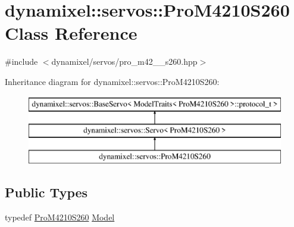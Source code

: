 \hypertarget{classdynamixel_1_1servos_1_1_pro_m4210_s260}{}\section{dynamixel\+:\+:servos\+:\+:Pro\+M4210\+S260 Class Reference}
\label{classdynamixel_1_1servos_1_1_pro_m4210_s260}


{\ttfamily \#include $<$dynamixel/servos/pro\+\_\+m42\+\_\+\_\+s260.\+hpp$>$}

Inheritance diagram for dynamixel\+:\+:servos\+:\+:Pro\+M4210\+S260\+:\begin{figure}[H]
\begin{center}
\leavevmode
\includegraphics[height=3.000000cm]{classdynamixel_1_1servos_1_1_pro_m4210_s260}
\end{center}
\end{figure}
\subsection*{Public Types}
\begin{DoxyCompactItemize}
\item 
typedef \hyperlink{classdynamixel_1_1servos_1_1_pro_m4210_s260}{Pro\+M4210\+S260} \hyperlink{classdynamixel_1_1servos_1_1_pro_m4210_s260_a9ab2a4df1844e3795e8c4c3377be9e0c}{Model}
\end{DoxyCompactItemize}
